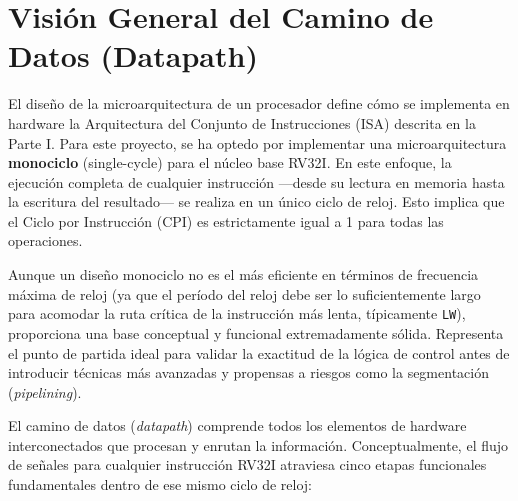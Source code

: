 

\label{chp:DisenoRTL}

\section{Visión General del Camino de Datos (Datapath)}
\label{sec:DatapathGeneral}

El diseño de la microarquitectura de un procesador define cómo se implementa en hardware la Arquitectura del Conjunto de Instrucciones (ISA) descrita en la Parte I. Para este proyecto, se ha optedo por implementar una microarquitectura \textbf{monociclo} (single-cycle) para el núcleo base RV32I. En este enfoque, la ejecución completa de cualquier instrucción —desde su lectura en memoria hasta la escritura del resultado— se realiza en un único ciclo de reloj. Esto implica que el Ciclo por Instrucción (CPI) es estrictamente igual a 1 para todas las operaciones.

Aunque un diseño monociclo no es el más eficiente en términos de frecuencia máxima de reloj (ya que el período del reloj debe ser lo suficientemente largo para acomodar la ruta crítica de la instrucción más lenta, típicamente \texttt{LW}), proporciona una base conceptual y funcional extremadamente sólida. Representa el punto de partida ideal para validar la exactitud de la lógica de control antes de introducir técnicas más avanzadas y propensas a riesgos como la segmentación (\textit{pipelining}).

El camino de datos (\textit{datapath}) comprende todos los elementos de hardware interconectados que procesan y enrutan la información. Conceptualmente, el flujo de señales para cualquier instrucción RV32I atraviesa cinco etapas funcionales fundamentales dentro de ese mismo ciclo de reloj:

